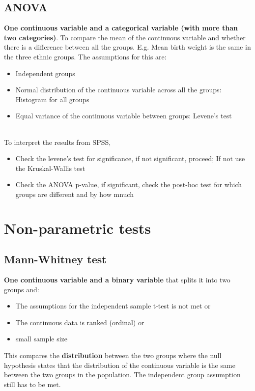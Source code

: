 \documentclass{article}
\begin{document}
\subsection{ANOVA}
\textbf{One continuous variable and a categorical variable (with more than two categories)}. To compare the mean of the continuous variable and whether there is a difference between all the groups. E.g. Mean birth weight is the same in the three ethnic groups. The assumptions for this are:
\begin{itemize}
    \item Independent groups
    \item Normal distribution of the continuous variable across all the groups: Histogram for all groups
    \item Equal variance of the continuous variable between groups: Levene's test
\end{itemize}
\mbox{}\\
To interpret the results from SPSS,
\begin{itemize}
    \item Check the levene's test for significance, if not significant, proceed; If not use the Kruskal-Wallis test
    \item Check the ANOVA p-value, if significant, check the post-hoc test for which groups are different and by how mnuch
\end{itemize}

\pagebreak
\section{Non-parametric tests}
\subsection{Mann-Whitney test}
\textbf{One continuous variable and a binary variable} that splits it into two groups and:
\begin{itemize}
    \item The assumptions for the independent sample t-test is not met or
    \item The continuous data is ranked (ordinal) or
    \item small sample size
\end{itemize}
This compares the \textbf{distribution} between the two groups where the null hypothesis states that the distribution of the continuous variable is the same between the two groups in the population. The independent group assumption still has to be met.
\end{document}
